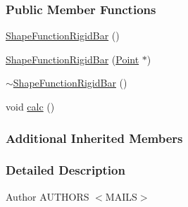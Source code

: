 \subsubsection*{Public Member Functions}
\begin{DoxyCompactItemize}
\item 
\hyperlink{classmknix_1_1_shape_function_rigid_bar_a13dc2ac9712a848c5f870089abfb2129}{Shape\-Function\-Rigid\-Bar} ()
\item 
\hyperlink{classmknix_1_1_shape_function_rigid_bar_aca749e8665ce75cc847d9376dac52ea9}{Shape\-Function\-Rigid\-Bar} (\hyperlink{classmknix_1_1_point}{Point} $\ast$)
\item 
\hyperlink{classmknix_1_1_shape_function_rigid_bar_ac95778202de9d1afca7c0198f0693365}{$\sim$\-Shape\-Function\-Rigid\-Bar} ()
\item 
void \hyperlink{classmknix_1_1_shape_function_rigid_bar_aad8c4377cc329c96dff9afa95b624a43}{calc} ()
\end{DoxyCompactItemize}
\subsubsection*{Additional Inherited Members}


\subsubsection{Detailed Description}
\begin{DoxyAuthor}{Author}
A\-U\-T\-H\-O\-R\-S $<$\-M\-A\-I\-L\-S$>$ 
\end{DoxyAuthor}


